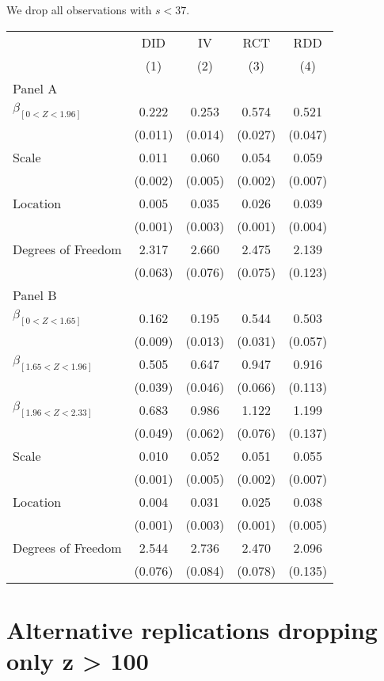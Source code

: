 \documentclass[
]{article}
\begin{document}
We drop all observations with \(s < 37\).

\def\sym#1{\ifmmode^{#1}\else\(^{#1}\)\fi} \begin{tabular}{l*{4}{c}} \hline\hline & \multicolumn{1}{c}{DID} &  \multicolumn{1}{c}{IV} &  \multicolumn{1}{c}{RCT} &  \multicolumn{1}{c}{RDD}\\  & \multicolumn{1}{c}{(1)} &  \multicolumn{1}{c}{(2)} &  \multicolumn{1}{c}{(3)} &  \multicolumn{1}{c}{(4)}\\  \hline \hline  Panel A \\  $\beta_{[0 < Z < 1.96]}$ & 0.222 &  0.253 &  0.574 &  0.521\\ & (0.011) &  (0.014) &  (0.027) &  (0.047)\\  Scale & 0.011 &  0.060 &  0.054 &  0.059\\ & (0.002) &  (0.005) &  (0.002) &  (0.007) \\  Location & 0.005 &  0.035 &  0.026 &  0.039\\ & (0.001) &  (0.003) &  (0.001) &  (0.004) \\  Degrees of Freedom & 2.317 &  2.660 &  2.475 &  2.139\\ & (0.063) &  (0.076) &  (0.075) &  (0.123)\\ Panel B \\  $\beta_{[0 < Z < 1.65]}$ & 0.162 &  0.195 &  0.544 &  0.503\\ & (0.009) &  (0.013) &  (0.031) &  (0.057)\\  $\beta_{[1.65 < Z < 1.96]}$ & 0.505 &  0.647 &  0.947 &  0.916\\ & (0.039) &  (0.046) &  (0.066) &  (0.113)\\   $\beta_{[1.96 < Z < 2.33]}$ & 0.683 &  0.986 &  1.122 &  1.199\\ & (0.049) &  (0.062) &  (0.076) &  (0.137)\\  Scale & 0.010 &  0.052 &  0.051 &  0.055\\ & (0.001) &  (0.005) &  (0.002) &  (0.007) \\  Location & 0.004 &  0.031 &  0.025 &  0.038\\ & (0.001) &  (0.003) &  (0.001) &  (0.005) \\  Degrees of Freedom & 2.544 &  2.736 &  2.470 &  2.096\\ & (0.076) &  (0.084) &  (0.078) &  (0.135)\\  \hline\hline \end{tabular}

\hypertarget{alternative-replications-dropping-only-z-100}{%
\section{Alternative replications dropping only z \textgreater{}
100}\label{alternative-replications-dropping-only-z-100}}
\end{document}
